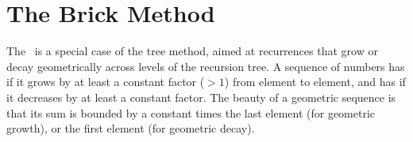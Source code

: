 









\section{The Brick Method}
\label{sec:analysis::recurrences::brick-method}

\begin{gram}
  The~ is a special case of the tree method, aimed
  at recurrences that grow or decay geometrically across levels of the
  recursion tree.
%
  A sequence of numbers has  if it grows by at
  least a constant factor ($> 1$) from element to element, and has  if it decreases by at least a constant
  factor.  
%
  The beauty of a geometric sequence is that its sum is
  bounded by a constant times the last element (for geometric growth), or
  the first element (for geometric decay).
\end{gram}

